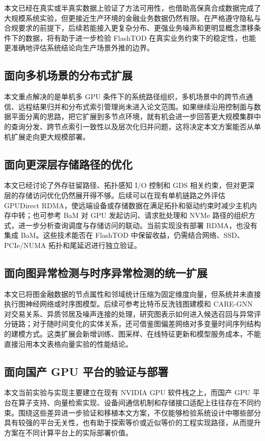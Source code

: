 本文已经在真实或半真实数据上验证了方法可用性，也借助高保真合成数据完成了大规模系统实验，但更接近生产环境的金融业务数据仍然有限。在严格遵守隐私与合规要求的前提下，后续若能接入更复杂分布、更强业务噪声和更明显概念漂移条件下的数据，将有助于进一步检验 FlashTOD 在真实业务约束下的稳定性，也能更准确地评估系统结论向生产场景外推的边界。

\subsection{面向多机场景的分布式扩展}

本文重点解决的是单机多 GPU 条件下的系统路径组织，多机场景中的跨节点通信、远程结果归并和分布式索引管理尚未进入论文范围。如果继续沿用控制面与数据平面分离的思路，把它扩展到多节点环境，就有机会进一步回答更大规模集群中的查询分发、跨节点索引一致性以及层次化归并问题，这将决定本文方案能否从单机扩展走向更大规模部署。

\subsection{面向更深层存储路径的优化}

本文已经讨论了外存驻留路径、拓扑感知 I/O 控制和 GDS 相关约束，但对更深层的存储访问优化仍然展开得不够。后续可以在现有单机链路之外评估 GPUDirect RDMA，使远端设备或存储数据在满足拓扑和驱动约束时减少主机内存中转\citep{nvidia2026gpudirectrdma}；也可参考 BaM 对 GPU 发起访问、请求批处理和 NVMe 路径的组织方式\citep{qureshi2023bam}，进一步分析查询调度与存储访问的联动。当前实现没有部署 RDMA，也没有集成 BaM。这些技术能否在 FlashTOD 中保留收益，仍需结合网络、SSD、PCIe/NUMA 拓扑和尾延迟进行独立验证。

\subsection{面向图异常检测与时序异常检测的统一扩展}

本文已将图金融数据的节点属性和邻域统计压缩为固定维度向量，但系统并未直接执行图神经网络或时序图模型。后续可参考比特币反洗钱图建模和 CARE-GNN 对交易关系、异质邻居及噪声连接的处理\citep{weber2019bitcoinaml,dou2020caregnn}，研究图表示如何进入候选召回与异常评分链路；对于随时间变化的实体关系，还可借鉴图偏差网络对多变量时间序列结构的建模方式\citep{deng2021gdn}。这类扩展会新增训练、图采样、在线特征更新和模型服务成本，不能直接沿用本文表格向量实验的性能结论。

\subsection{面向国产 GPU 平台的验证与部署}

本文当前实验与实现主要建立在现有 NVIDIA GPU 软件栈之上，而国产 GPU 平台在算子支持、向量检索实现、设备间通信机制和存储接口适配上往往存在不同约束。围绕这些差异进一步验证和移植本文方案，不仅能够检验系统设计中哪些部分具有较强的平台无关性，也有助于探索等价或近似等价的工程实现路径，从而提升方案在不同计算平台上的实际部署价值。
